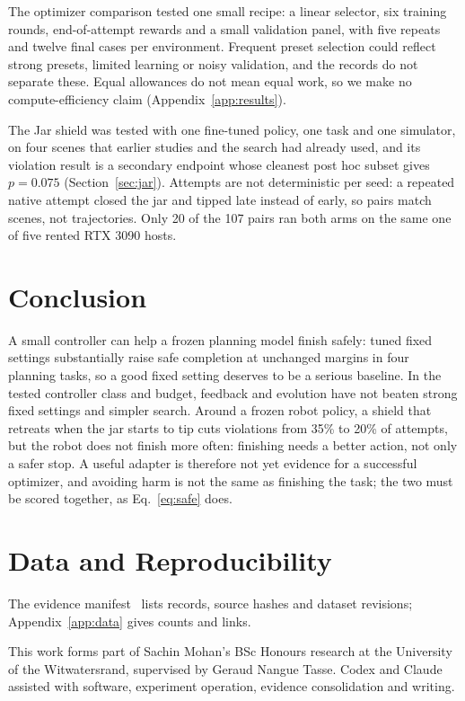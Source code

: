 \documentclass[sigconf,nonacm]{acmart}
\begin{document}
The optimizer comparison tested one small recipe: a linear selector, six
training rounds, end-of-attempt rewards and a small validation panel, with
five repeats and twelve final cases per environment. Frequent preset
selection could reflect strong presets, limited learning or noisy
validation, and the records do not separate these. Equal allowances do not
mean equal work, so we make no compute-efficiency claim
(Appendix~\ref{app:results}).

The Jar shield was tested with one fine-tuned policy, one task and one
simulator, on four scenes that earlier studies and the search had already
used, and its violation result is a secondary endpoint whose cleanest post
hoc subset gives $p=0.075$ (Section~\ref{sec:jar}).
Attempts are not deterministic per seed: a repeated native attempt closed
the jar and tipped late instead of early, so pairs match scenes, not
trajectories. Only 20 of the 107 pairs ran both arms on the same one of five
rented RTX 3090 hosts.

\section{Conclusion}
A small controller can help a frozen planning model finish safely: tuned
fixed settings substantially raise safe completion at unchanged margins in
four planning tasks, so a good fixed setting deserves to be a serious
baseline. In the tested controller class and budget, feedback and evolution
have not beaten strong fixed settings and simpler search. Around a frozen
robot policy, a shield that retreats when the jar starts to tip cuts
violations from 35\% to 20\% of attempts, but the robot does not finish more
often: finishing needs a better action, not only a safer stop. A useful
adapter is therefore not yet evidence for a successful optimizer, and
avoiding harm is not the same as finishing the task; the two must be scored
together, as Eq.~\ref{eq:safe} does.

\section*{Data and Reproducibility}
The evidence manifest~\cite{mohan2026evidence} lists records, source hashes
and dataset revisions; Appendix~\ref{app:data} gives counts and links.

\begin{acks}
This work forms part of Sachin Mohan's BSc Honours research at the University
of the Witwatersrand, supervised by Geraud Nangue Tasse. Codex and Claude
assisted with software, experiment operation, evidence consolidation and
writing.
\end{acks}
\end{document}
